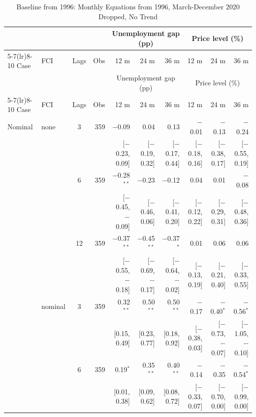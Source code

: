 \begingroup\scriptsize\setlength{\tabcolsep}{0.9pt}
\begin{longtable}{llcrrrrrrr}
\caption{Baseline from 1996: Monthly Equations from 1996, March-December 2020 Dropped, No Trend}\label{tab:appB}\\
\toprule
 & & & & \multicolumn{3}{c}{Unemployment gap (pp)} & \multicolumn{3}{c}{Price level (\%)}\\ \cmidrule(lr){5-7}\cmidrule(lr){8-10}
Case & FCI & Lags & Obs & 12 m & 24 m & 36 m & 12 m & 24 m & 36 m\\
\midrule\endfirsthead
\toprule
 & & & & \multicolumn{3}{c}{Unemployment gap (pp)} & \multicolumn{3}{c}{Price level (\%)}\\ \cmidrule(lr){5-7}\cmidrule(lr){8-10}
Case & FCI & Lags & Obs & 12 m & 24 m & 36 m & 12 m & 24 m & 36 m\\
\midrule\endhead
\bottomrule\endfoot
Nominal & none & 3 & 359 & $-$0.09 & 0.04 & 0.13 & $-$0.01 & $-$0.13 & $-$0.24\\
 & & & & {\scriptsize [$-$0.23, 0.09]} & {\scriptsize [$-$0.19, 0.32]} & {\scriptsize [$-$0.17, 0.44]} & {\scriptsize [$-$0.18, 0.16]} & {\scriptsize [$-$0.38, 0.17]} & {\scriptsize [$-$0.55, 0.19]}\\
 &  & 6 & 359 & $-$0.28$^{**}$ & $-$0.23 & $-$0.12 & 0.04 & 0.01 & $-$0.08\\
 & & & & {\scriptsize [$-$0.45, $-$0.09]} & {\scriptsize [$-$0.46, 0.06]} & {\scriptsize [$-$0.41, 0.20]} & {\scriptsize [$-$0.12, 0.22]} & {\scriptsize [$-$0.29, 0.31]} & {\scriptsize [$-$0.48, 0.36]}\\
 &  & 12 & 359 & $-$0.37$^{**}$ & $-$0.45$^{**}$ & $-$0.37$^{*}$ & 0.01 & 0.06 & 0.06\\
 & & & & {\scriptsize [$-$0.55, $-$0.18]} & {\scriptsize [$-$0.69, $-$0.17]} & {\scriptsize [$-$0.64, $-$0.02]} & {\scriptsize [$-$0.13, 0.19]} & {\scriptsize [$-$0.21, 0.40]} & {\scriptsize [$-$0.33, 0.55]}\\
 & nominal & 3 & 359 & 0.32$^{**}$ & 0.50$^{**}$ & 0.50$^{**}$ & $-$0.17 & $-$0.40$^{*}$ & $-$0.56$^{*}$\\
 & & & & {\scriptsize [0.15, 0.49]} & {\scriptsize [0.23, 0.77]} & {\scriptsize [0.18, 0.92]} & {\scriptsize [$-$0.38, 0.03]} & {\scriptsize [$-$0.73, $-$0.07]} & {\scriptsize [$-$1.05, $-$0.10]}\\
 &  & 6 & 359 & 0.19$^{*}$ & 0.35$^{**}$ & 0.40$^{**}$ & $-$0.14 & $-$0.35 & $-$0.54$^{*}$\\
 & & & & {\scriptsize [0.01, 0.38]} & {\scriptsize [0.09, 0.62]} & {\scriptsize [0.08, 0.72]} & {\scriptsize [$-$0.33, 0.07]} & {\scriptsize [$-$0.70, 0.00]} & {\scriptsize [$-$0.99, 0.00]}\\

\end{longtable}
